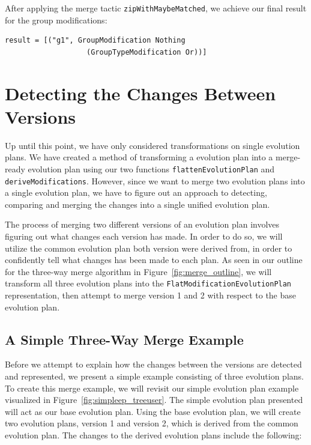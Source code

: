 \documentclass[a4paper,english]{ifimaster}
\begin{document}
After applying the merge tactic \texttt{zipWithMaybeMatched}, we achieve our final result for the group modifications:

\begin{verbatim}
result = [("g1", GroupModification Nothing 
                   (GroupTypeModification Or))]
\end{verbatim}

\section{Detecting the Changes Between Versions}%
\label{sec:detecting_the_changes_between_versions}

Up until this point, we have only considered transformations on single evolution plans. We have created a method of transforming a evolution plan into a merge-ready evolution plan using our two functions \texttt{flattenEvolutionPlan} and \texttt{deriveModifications}. However, since we want to merge two evolution plans into a single evolution plan, we have to figure out an approach to detecting, comparing and merging the changes into a single unified evolution plan.

The process of merging two different versions of an evolution plan involves figuring out what changes each version has made. In order to do so, we will utilize the common evolution plan both version were derived from, in order to confidently tell what changes has been made to each plan. As seen in our outline for the three-way merge algorithm in Figure~\vref{fig:merge_outline}, we will transform all three evolution plans into the \texttt{FlatModificationEvolutionPlan} representation, then attempt to merge version 1 and 2 with respect to the base evolution plan.

\subsection{A Simple Three-Way Merge Example}%
\label{sub:a_simple_three_way_merge_example}

Before we attempt to explain how the changes between the versions are detected and represented, we present a simple example consisting of three evolution plans. To create this merge example, we will revisit our simple evolution plan example visualized in Figure~\ref{fig:simpleep_treeuser}. The simple evolution plan presented will act as our base evolution plan. Using the base evolution plan, we will create two evolution plans, version 1 and version 2, which is derived from the common evolution plan. The changes to the derived evolution plans include the following:
\end{document}
